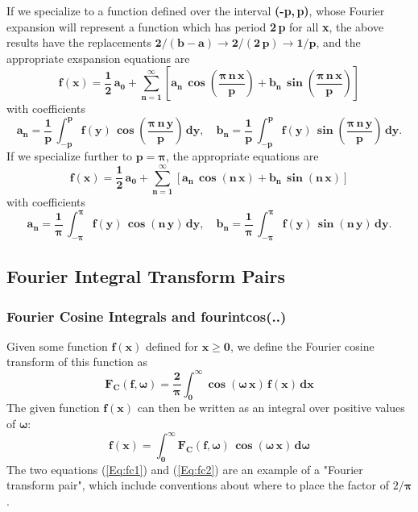 \documentclass[12pt]{article}
\begin{document}
\noindent If we specialize to a function defined over the interval \textbf{(-p,\,p)}, whose Fourier
  expansion will represent a function which has period \textbf{2\,p} for all \textbf{x}, 
  the above results have the replacements $\mathbf{2/(b-a) \rightarrow 2/(2\,p) \rightarrow 1/p}$, and
the appropriate exspansion equations are
\begin{equation}  \label{Eq:pex1}
\mathbf{f(x) = \frac{1}{2} \, a_{0} + \sum_{n=1}^{\infty} \left[ 
   a_{n}\,\boldsymbol{\cos} \left( \frac{ \boldsymbol{\pi}\,n\,x}{p} \right) +
   b_{n} \,\boldsymbol{\sin} \left( \frac{ \boldsymbol{\pi}\,n\,x}{p} \right) \right] }
\end{equation}
with coefficients
\begin{equation} \label{Eq:pex2}
\mathbf{ a_{n} = \frac{1}{p} \, \int_{-p}^{p} f(y)\,
   \boldsymbol{\cos} \left( \frac{ \boldsymbol{\pi}\,n\,y}{p} \right) \, dy}, \quad
   \mathbf{ b_{n} = \frac{1}{p} \, \int_{-p}^{p} f(y)\,
   \boldsymbol{\sin} \left( \frac{ \boldsymbol{\pi}\,n\,y}{p} \right) \, dy}. 
\end{equation}
If we specialize further to $\mathbf{p = \boldsymbol{\pi}}$, the appropriate equations
  are
\begin{equation}  \label{Eq:piex1}
\mathbf{f(x) = \frac{1}{2} \, a_{0} + \sum_{n=1}^{\infty} \left[ 
   a_{n}\,\boldsymbol{\cos} (n\,x) + b_{n} \,\boldsymbol{\sin} (n\,x) \right] }
\end{equation}
with coefficients
\begin{equation} \label{Eq:piex2}
\mathbf{ a_{n} = \frac{1}{\boldsymbol{\pi}} \, \int_{-\boldsymbol{\pi}}^{\boldsymbol{\pi}} f(y)\,
   \boldsymbol{\cos} (n\,y) \, dy}, \quad
   \mathbf{ b_{n} = \frac{1}{\boldsymbol{\pi}} \, \int_{-\boldsymbol{\pi}}^{\boldsymbol{\pi}} f(y)\,
   \boldsymbol{\sin} (n\,y) \, dy}. 
\end{equation}
\subsection{Fourier Integral Transform Pairs}
\subsubsection{Fourier Cosine Integrals and \textbf{fourintcos(..)}}
Given some function $\mathbf{f(x)}$ defined for $\mathbf{x \geq 0}$,
  we define the Fourier cosine transform  of this function as
\begin{equation}  \label{Eq:fc1}
\mathbf{F_{C}(f,\boldsymbol{\omega}) = \frac{2}{\boldsymbol{\pi}} 
  \int_{0}^{\infty} \boldsymbol{\cos}(\boldsymbol{\omega}\,x)\,f(x)\,dx }
\end{equation}
The given function $\mathbf{f(x)}$ can then be written as an integral
  over positive values of $\boldsymbol{\omega}$:
\begin{equation}  \label{Eq:fc2}
\mathbf{f(x) = \int_{0}^{\infty} F_{C}(f,\boldsymbol{\omega})\,
    \cos(\boldsymbol{\omega}\,x)\,d\boldsymbol{\omega} }
\end{equation}
The two equations (\ref{Eq:fc1}) and (\ref{Eq:fc2}) are an example of
  a "Fourier transform pair", which include conventions about where
  to place the factor of $2/\boldsymbol{\pi}$.\\
\end{document}
